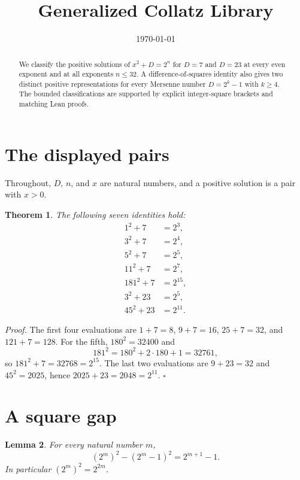 \documentclass[11pt,letterpaper]{article}
\title{Generalized Collatz Library}
\author{}
\date{\today}
\newtheorem{theorem}{Theorem}
\newtheorem{lemma}[theorem]{Lemma}
\newenvironment{proof}{\noindent\textit{Proof.}}{\hfill\(\square\)}
\begin{document}
\maketitle

\begin{abstract}
We classify the positive solutions of \(x^2+D=2^n\) for \(D=7\) and \(D=23\) at every even exponent and at all exponents \(n\le 32\). A difference-of-squares identity also gives two distinct positive representations for every Mersenne number \(D=2^k-1\) with \(k\ge 4\). The bounded classifications are supported by explicit integer-square brackets and matching Lean proofs.
\end{abstract}

\section{The displayed pairs}

Throughout, \(D\), \(n\), and \(x\) are natural numbers, and a positive solution is a pair with \(x>0\).

\begin{theorem}
\label{thm:displayed}
The following seven identities hold:
\begin{align*}
1^2+7&=2^3,\\
3^2+7&=2^4,\\
5^2+7&=2^5,\\
11^2+7&=2^7,\\
181^2+7&=2^{15},\\
3^2+23&=2^5,\\
45^2+23&=2^{11}.
\end{align*}
\end{theorem}

\begin{proof}
The first four evaluations are \(1+7=8\), \(9+7=16\), \(25+7=32\), and \(121+7=128\). For the fifth, \(180^2=32400\) and
\[
181^2=180^2+2\cdot 180+1=32761,
\]
so \(181^2+7=32768=2^{15}\). The last two evaluations are \(9+23=32\) and \(45^2=2025\), hence \(2025+23=2048=2^{11}\).
\end{proof}

\section{A square gap}

\begin{lemma}
\label{lem:gap}
For every natural number \(m\),
\[
(2^m)^2-(2^m-1)^2=2^{m+1}-1.
\]
In particular \((2^m)^2=2^{2m}\).
\end{lemma}
\end{document}
